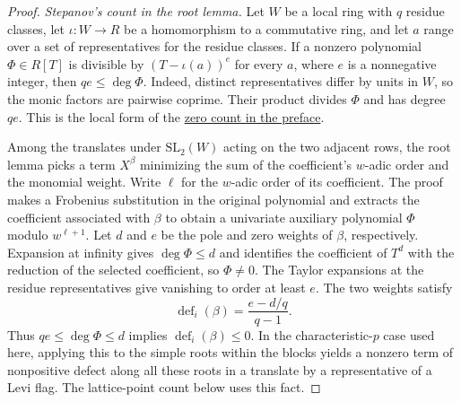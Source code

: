 \begin{proof}
\label{par:a-stepanov-count}
\emph{Stepanov's count in the root lemma.} Let $W$ be a local ring with $q$ residue classes, let $\iota:W\to R$ be a homomorphism to a commutative ring, and let $a$ range over a set of representatives for the residue classes. If a nonzero polynomial $\Phi\in R[T]$ is divisible by $(T-\iota(a))^e$ for every $a$, where $e$ is a nonnegative integer, then $qe\le\deg\Phi$. Indeed, distinct representatives differ by units in $W$, so the monic factors are pairwise coprime. Their product divides $\Phi$ and has degree $qe$. This is the local form of the \hyperref[par:stepanov-method]{zero count in the preface}.

Among the translates under $\mathrm{SL}_2(W)$ acting on the two adjacent rows, the root lemma picks a term $X^\beta$ minimizing the sum of the coefficient's $w$-adic order and the monomial weight. Write $\ell$ for the $w$-adic order of its coefficient. The proof makes a Frobenius substitution in the original polynomial and extracts the coefficient associated with $\beta$ to obtain a univariate auxiliary polynomial $\Phi$ modulo $w^{\ell+1}$. Let $d$ and $e$ be the pole and zero weights of $\beta$, respectively. Expansion at infinity gives $\deg\Phi\le d$ and identifies the coefficient of $T^d$ with the reduction of the selected coefficient, so $\Phi\ne0$. The Taylor expansions at the residue representatives give vanishing to order at least $e$. The two weights satisfy
\[
 \operatorname{def}_i(\beta)=\frac{e-d/q}{q-1}.
\]
Thus $qe\le\deg\Phi\le d$ implies $\operatorname{def}_i(\beta)\le0$. In the characteristic-$p$ case used here, applying this to the simple roots within the blocks yields a nonzero term of nonpositive defect along all these roots in a translate by a representative of a Levi flag. The lattice-point count below uses this fact.


\end{proof}

